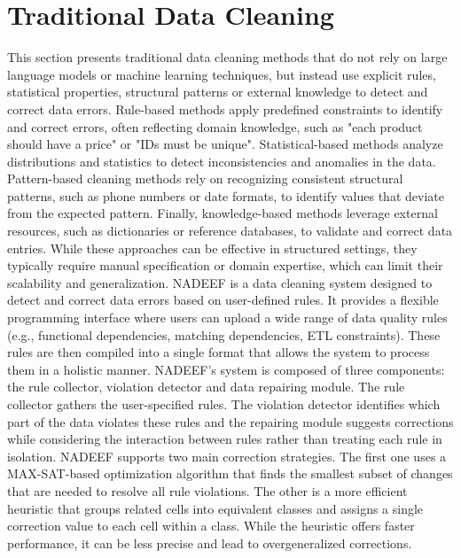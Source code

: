\section{Traditional Data Cleaning}
This section presents traditional data cleaning methods that do not rely on large language models or machine learning techniques, but instead use explicit rules, statistical properties, structural patterns or external knowledge to detect and correct data errors.
Rule-based methods apply predefined constraints to identify and correct errors, often reflecting domain knowledge, such as "each product should have a price" or "IDs must be unique".
Statistical-based methods analyze distributions and statistics to detect inconsistencies and anomalies in the data.
Pattern-based cleaning methods rely on recognizing consistent structural patterns, such as phone numbers or date formats, to identify values that deviate from the expected pattern. 
Finally, knowledge-based methods leverage external resources, such as dictionaries or reference databases, to validate and correct data entries.
While these approaches can be effective in structured settings, they typically require manual specification or domain expertise, which can limit their scalability and generalization.
\newline\newline
NADEEF \cite{NADEEF} is a data cleaning system designed to detect and correct data errors based on user-defined rules. 
It provides a flexible programming interface where users can upload a wide range of data quality rules (e.g., functional dependencies, matching dependencies, ETL constraints). 
These rules are then compiled into a single format that allows the system to process them in a holistic manner. 
NADEEF's system is composed of three components: the rule collector, violation detector and data repairing module. 
The rule collector gathers the user-specified rules. 
The violation detector identifies which part of the data violates these rules and the repairing module suggests corrections while considering the interaction between rules rather than treating each rule in isolation. 
NADEEF supports two main correction strategies. 
The first one uses a MAX-SAT-based optimization algorithm that finds the smallest subset of changes that are needed to resolve all rule violations. 
The other is a more efficient heuristic that groups related cells into equivalent classes and assigns a single correction value to each cell within a class. 
While the heuristic offers faster performance, it can be less precise and lead to overgeneralized corrections. 
